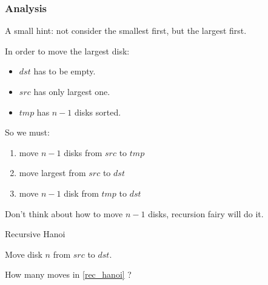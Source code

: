 \subsubsection{Analysis}
A small hint: not consider the smallest first, but the largest first.

In order to move the largest disk:
\begin{itemize}
    \item $dst$ has to be empty.
    \item $src$ has only largest one.
    \item $tmp$ has $n-1$ disks sorted.
\end{itemize}

So we must:
\begin{enumerate}
    \item move $n-1$ disks from $src$ to $tmp$
    \item move largest from $src$ to $dst$
    \item move $n-1$ disk from $tmp$ to $dst$

\end{enumerate}

Don't think about how to move $n-1$ disks, recursion fairy will do it.

\begin{algorithm}[h]
    \caption{Recursive Hanoi}\label{rec_hanoi}
    \begin{algorithmic}
                \State {}
                \State Move disk $n$ from $src$ to $dst$.
                \State {}
            \EndIf
        \EndProcedure
    \end{algorithmic}
\end{algorithm}

How many moves in \cref{rec_hanoi} ?

